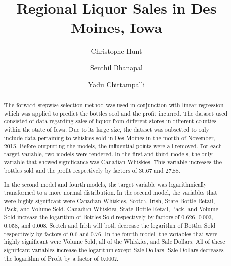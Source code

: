 \documentclass[]{elsarticle} %
\begin{document}
\begin{frontmatter}

  \title{Regional Liquor Sales in Des Moines, Iowa}
    \author[CUNY School of Professional Studies]{Christophe Hunt}
    \author[CUNY School of Professional Studies]{Senthil Dhanapal}
  
    \author[CUNY School of Professional Studies]{Yadu Chittampalli}
  
      \address[CUNY School of Professional Studies]{CUNY School of Professional Studies, Data Analytics, New York, NY}
  
  \begin{abstract}
  The forward stepwise selection method was used in conjunction with
  linear regression which was applied to predict the bottles sold and the
  profit incurred. The dataset used consisted of data regarding sales of
  liquor from different stores in different counties within the state of
  Iowa. Due to its large size, the dataset was subsetted to only include
  data pertaining to whiskies sold in Des Moines in the month of November,
  2015. Before outputting the models, the influential points were all
  removed. For each target variable, two models were rendered. In the
  first and third models, the only variable that showed significance was
  Canadian Whiskies. This variable increases the bottles sold and the
  profit respectively by factors of 30.67 and 27.88.
  
  In the second model and fourth models, the target variable was
  logarithmically transformed to a more normal distribution. In the second
  model, the variables that were highly significant were Canadian
  Whiskies, Scotch, Irish, State Bottle Retail, Pack, and Volume Sold.
  Canadian Whiskies, State Bottle Retail, Pack, and Volume Sold increase
  the logarithm of Bottles Sold respectively by factors of 0.626, 0.003,
  0.058, and 0.008. Scotch and Irish will both decrease the logarithm of
  Bottles Sold respectively by factors of 0.6 and 0.76. In the fourth
  model, the variables that were highly significant were Volume Sold, all
  of the Whiskies, and Sale Dollars. All of these significant variables
  increase the logarithm except Sale Dollars. Sale Dollars decreases the
  logarithm of Profit by a factor of 0.0002.
  \end{abstract}
  
 \end{frontmatter}
\end{document}
